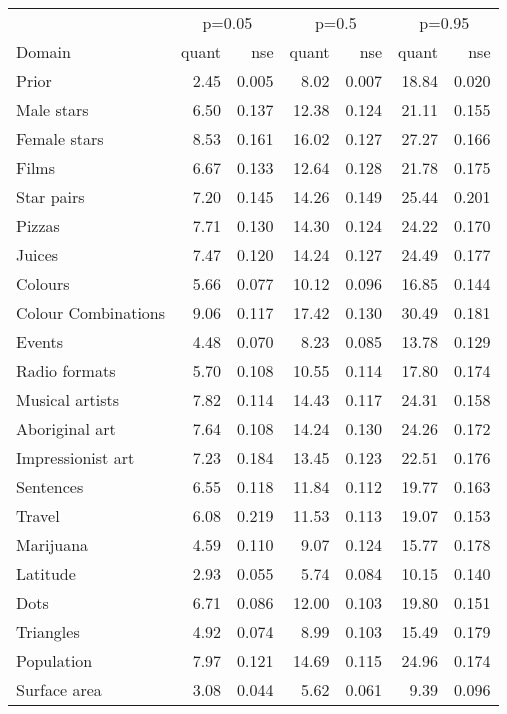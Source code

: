 
\begin{tabular}[t]{lrrrrrr}
\toprule
\multicolumn{1}{c}{ } & \multicolumn{2}{c}{p=0.05} & \multicolumn{2}{c}{p=0.5} & \multicolumn{2}{c}{p=0.95} \\
\cmidrule(l{3pt}r{3pt}){2-3} \cmidrule(l{3pt}r{3pt}){4-5} \cmidrule(l{3pt}r{3pt}){6-7}
Domain & quant & nse & quant & nse & quant & nse\\
\midrule
Prior & 2.45 & 0.005 & 8.02 & 0.007 & 18.84 & 0.020\\
Male stars & 6.50 & 0.137 & 12.38 & 0.124 & 21.11 & 0.155\\
Female stars & 8.53 & 0.161 & 16.02 & 0.127 & 27.27 & 0.166\\
Films & 6.67 & 0.133 & 12.64 & 0.128 & 21.78 & 0.175\\
Star pairs & 7.20 & 0.145 & 14.26 & 0.149 & 25.44 & 0.201\\
\addlinespace
Pizzas & 7.71 & 0.130 & 14.30 & 0.124 & 24.22 & 0.170\\
Juices & 7.47 & 0.120 & 14.24 & 0.127 & 24.49 & 0.177\\
Colours & 5.66 & 0.077 & 10.12 & 0.096 & 16.85 & 0.144\\
Colour Combinations & 9.06 & 0.117 & 17.42 & 0.130 & 30.49 & 0.181\\
Events & 4.48 & 0.070 & 8.23 & 0.085 & 13.78 & 0.129\\
\addlinespace
Radio formats & 5.70 & 0.108 & 10.55 & 0.114 & 17.80 & 0.174\\
Musical artists & 7.82 & 0.114 & 14.43 & 0.117 & 24.31 & 0.158\\
Aboriginal art & 7.64 & 0.108 & 14.24 & 0.130 & 24.26 & 0.172\\
Impressionist art & 7.23 & 0.184 & 13.45 & 0.123 & 22.51 & 0.176\\
Sentences & 6.55 & 0.118 & 11.84 & 0.112 & 19.77 & 0.163\\
\addlinespace
Travel & 6.08 & 0.219 & 11.53 & 0.113 & 19.07 & 0.153\\
Marijuana & 4.59 & 0.110 & 9.07 & 0.124 & 15.77 & 0.178\\
Latitude & 2.93 & 0.055 & 5.74 & 0.084 & 10.15 & 0.140\\
Dots & 6.71 & 0.086 & 12.00 & 0.103 & 19.80 & 0.151\\
Triangles & 4.92 & 0.074 & 8.99 & 0.103 & 15.49 & 0.179\\
\addlinespace
Population & 7.97 & 0.121 & 14.69 & 0.115 & 24.96 & 0.174\\
Surface area & 3.08 & 0.044 & 5.62 & 0.061 & 9.39 & 0.096\\

\end{tabular}
